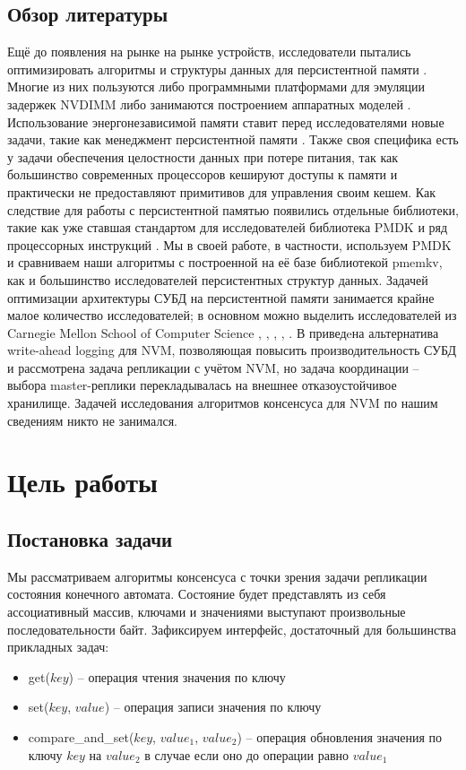 \documentclass[pdftex,ptm,12pt,a4paper]{report}
\theoremstyle{definition}
\begin{document}
\section{Обзор литературы}
Ещё до появления на рынке на рынке устройств, исследователи пытались оптимизировать алгоритмы \cite{iwabuchi2014nvm} и структуры данных \cite{chen2015persistent} для персистентной памяти .
Многие из них пользуются либо программными платформами для эмуляции задержек NVDIMM \cite{sengupta2015framework} либо занимаются построением аппаратных моделей \cite{dong2012nvsim}.
Использование энергонезависимой памяти ставит перед исследователями новые задачи, такие как менеджмент персистентной памяти \cite{schwalb2015nvm}. Также своя специфика есть у задачи обеспечения
целостности данных при потере питания, так как большинство современных процессоров кешируют доступы к памяти и практически не предоставляют примитивов для управления своим кешем.
Как следствие для работы с персистентной памятью появились отдельные библиотеки, такие как уже ставшая стандартом для исследователей библиотека PMDK \cite{pmdk}
и ряд процессорных инструкций \cite{kolli2016delegated}.  Мы в своей работе, в частности, используем PMDK и сравниваем наши алгоритмы с построенной на её базе библиотекой pmemkv, 
\cite{pmemkv} как и большинство исследователей персистентных структур данных.
Задачей оптимизации архитектуры СУБД на персистентной памяти занимается крайне малое количество исследователей; в основном можно выделить исследователей из Carnegie Mellon School of Computer Science
\cite{pavlo17}, \cite{arulraj2015let}, \cite{debrabant2014prolegomenon}, \cite{arulraj2017build}, \cite{writebehind}.  В \cite{writebehind} приведeна альтернатива write-ahead logging
для NVM, позволяющая повысить производительность СУБД и рассмотрена задача репликации с учётом NVM, но задача координации -- выбора master-реплики перекладывалась на внешнее отказоустойчивое хранилище.
Задачей исследования алгоритмов консенсуса для NVM по нашим сведениям никто не занимался.

\chapter{Цель работы}
\section{Постановка задачи}
Мы рассматриваем алгоритмы консенсуса с точки зрения задачи репликации состояния конечного автомата. Состояние будет представлять из себя ассоциативный массив, ключами и значениями
выступают произвольные последовательности байт. Зафиксируем интерфейс, достаточный для большинства прикладных задач:
\begin{itemize}
    \item get($key$) -- операция чтения значения по ключу
    \item set($key$, $value$) -- операция записи значения по ключу
    \item compare\_and\_set($key$, $value_1$, $value_2$) -- операция обновления значения по ключу $key$ на $value_2$ в случае если оно до операции равно $value_1$
\end{itemize}
\end{document}

